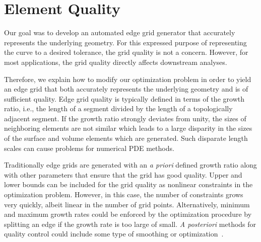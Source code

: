\section{Element Quality}
Our goal was to develop an automated edge grid generator that accurately 
represents the underlying geometry.  For this expressed purpose of 
representing the curve to a desired tolerance, the grid quality 
is not a concern.  However, for most applications, the grid quality 
directly affects downstream analyses.

Therefore, we explain how to modify our optimization problem in order to 
yield an edge grid that both accurately represents the underlying geometry 
and is of sufficient quality.  Edge grid quality is typically defined in 
terms of the growth ratio, i.e., the length of a segment divided by the 
length of a topologically adjacent segment.  If the growth ratio strongly 
deviates from unity, the sizes of neighboring elements are not 
similar which leads to a large disparity in the sizes of the surface and 
volume elements which are generated.  Such disparate length scales can 
cause problems for numerical PDE methods.

Traditionally edge grids are generated with an {\it{a priori}} defined 
growth ratio along with other parameters that ensure that the grid has 
good quality.  Upper and lower bounds can be included for the grid 
quality as nonlinear constraints in the optimization problem.  However, in 
this case, the number of constraints grows very quickly, albeit 
linear in the number of grid points.  Alternatively, minimum and maximum 
growth rates could be enforced by the optimization procedure by splitting 
an edge if the growth rate is too large of small.  {\it{A posteriori}} 
methods for quality control could include some type of 
smoothing or optimization~\cite{lori_pat,feasnewt,multiobjective,logbarrier}.

